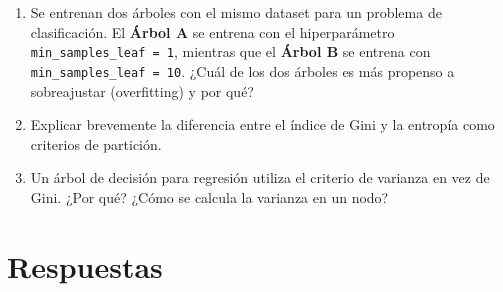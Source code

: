 \documentclass[12pt]{article}
\begin{document}
\begin{enumerate}
  \item Se entrenan dos árboles con el mismo dataset para un problema de clasificación. El \textbf{Árbol A} se entrena con el hiperparámetro \texttt{min\_samples\_leaf = 1}, mientras que el \textbf{Árbol B} se entrena con \texttt{min\_samples\_leaf = 10}. ¿Cuál de los dos árboles es más propenso a sobreajustar (overfitting) y por qué?

  \item Explicar brevemente la diferencia entre el índice de Gini y la entropía como criterios de partición.

  \item Un árbol de decisión para regresión utiliza el criterio de varianza en vez de Gini. ¿Por qué? ¿Cómo se calcula la varianza en un nodo?

\end{enumerate}

\newpage

\section*{Respuestas}
\end{document}
